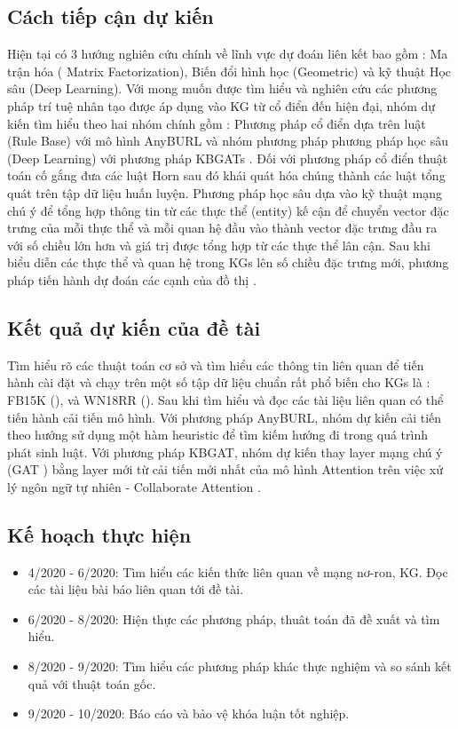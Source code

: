 \documentclass{article}[14pt]
\begin{document}
{    \subsection{Cách tiếp cận dự kiến}
    Hiện tại có 3 hướng nghiên cứu chính về lĩnh vực dự đoán liên kết bao gồm : Ma trận hóa ( Matrix Factorization), Biến đổi hình học (Geometric) và kỹ thuật Học sâu (Deep Learning). Với mong muốn được tìm hiểu và nghiên cứu các phương pháp trí tuệ nhân tạo được áp dụng vào KG từ cổ điển đến hiện đại, nhóm dự kiến tìm hiểu theo hai nhóm chính gồm : Phương pháp cổ điển dựa trên luật (Rule Base) với mô hình AnyBURL \cite{meilicke2019anytime} và nhóm phương pháp phương pháp học sâu (Deep Learning) với phương pháp KBGATs \cite{rossi2020knowledge}. Đối với phương pháp cổ điển thuật toán cố gắng đưa các luật Horn \cite{Hornclause} sau đó khái quát hóa chúng thành các luật tổng quát trên tập dữ liệu huấn luyện. Phương pháp học sâu dựa vào kỹ thuật mạng chú ý để tổng hợp thông tin từ các thực thể (entity) kế cận để chuyển vector đặc trưng của mỗi thực thể và mỗi quan hệ đầu vào thành vector đặc trưng đầu ra với số chiều lớn hơn và giá trị được tổng hợp từ các thực thể lân cận. Sau khi biểu diễn các thực thể và quan hệ trong KGs lên số chiều đặc trưng mới, phương pháp tiến hành dự đoán các cạnh của đồ thị .
    
    \subsection{Kết quả dự kiến của đề tài}
    Tìm hiểu rõ các thuật toán cơ sở và tìm hiểu các thông tin liên quan để tiến hành cài đặt và chạy trên một số tập dữ liệu chuẩn rất phổ biến cho KGs là : FB15K (\cite{toutanova2015observed}), và WN18RR (\cite{bordes2013translating}).
    Sau khi tìm hiểu và đọc các tài liệu liên quan có thể tiến hành cải tiến mô hình. Với phương pháp AnyBURL, nhóm dự kiến cải tiến theo hướng sử dụng một hàm heuristic để tìm kiếm hướng đi trong quá trình phát sinh luật. Với phương pháp KBGAT, nhóm dự kiến thay layer mạng chú ý (GAT \cite{velivckovic2017graph}) bằng layer mới từ cải tiến mới nhất của mô hình Attention \cite{vaswani2017attention} trên việc xử lý ngôn ngữ tự nhiên - Collaborate Attention \cite{cordonnier2020multi} .
    
    \subsection{Kế hoạch thực hiện}
    \begin{itemize}
        \item 4/2020 - 6/2020: Tìm hiểu các kiến thức liên quan về mạng nơ-ron,  KG. Đọc các  tài liệu bài báo liên quan tới đề tài.
        \item 6/2020 - 8/2020: Hiện thực các phương pháp, thuât toán đã đề xuất và tìm hiểu.
        \item 8/2020 - 9/2020: Tìm hiểu các phương pháp khác thực nghiệm và so sánh kết quả với thuật toán gốc.
        \item 9/2020 - 10/2020: Báo cáo và bảo vệ khóa luận tốt nghiệp.
    \end{itemize}
    }
\end{document}
